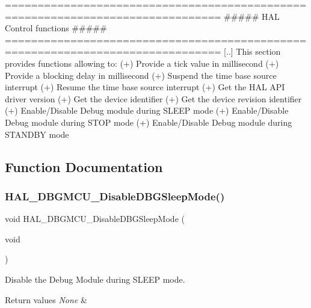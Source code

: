 \begin{DoxyVerb} ===============================================================================
                      ##### HAL Control functions #####
 ===============================================================================
    [..]  This section provides functions allowing to:
      (+) Provide a tick value in millisecond
      (+) Provide a blocking delay in millisecond
      (+) Suspend the time base source interrupt
      (+) Resume the time base source interrupt
      (+) Get the HAL API driver version
      (+) Get the device identifier
      (+) Get the device revision identifier
      (+) Enable/Disable Debug module during SLEEP mode
      (+) Enable/Disable Debug module during STOP mode
      (+) Enable/Disable Debug module during STANDBY mode\end{DoxyVerb}
 

\subsection{Function Documentation}
\mbox{\label{group___h_a_l___exported___functions___group2_gac7820d0561f19999a68d714655b901b5}} 
\subsubsection{\texorpdfstring{H\+A\+L\+\_\+\+D\+B\+G\+M\+C\+U\+\_\+\+Disable\+D\+B\+G\+Sleep\+Mode()}{HAL\_DBGMCU\_DisableDBGSleepMode()}}
{\footnotesize\ttfamily void H\+A\+L\+\_\+\+D\+B\+G\+M\+C\+U\+\_\+\+Disable\+D\+B\+G\+Sleep\+Mode (\begin{DoxyParamCaption}\item[{void}]{ }\end{DoxyParamCaption})}



Disable the Debug Module during S\+L\+E\+EP mode. 


\begin{DoxyRetVals}{Return values}
{\em None} & \\
\hline
\end{DoxyRetVals}
\mbox{\label{group___h_a_l___exported___functions___group2_ga7faa58d8508ea3123b9f247a70379779}} 
